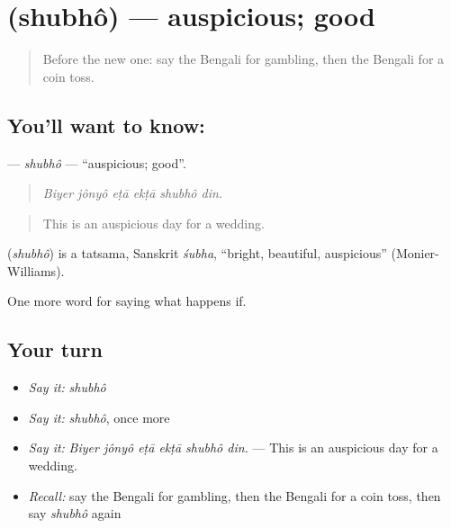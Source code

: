\section[\texorpdfstring{\bn{শুভ} (shubhô)}{শুভ (shubhô)}]{ (shubhô) — auspicious; good}

\label{lesson:BN-C534-shubho}



\begin{quote}
Before the new one: say the Bengali for gambling, then the Bengali for a coin toss.
\end{quote}

\subsection*{You'll want to know: }
\textbf{} — \emph{shubhô} — \textquotedblleft{}auspicious; good\textquotedblright{}.

\begin{quote}
     
\end{quote}

\begin{quote}
\emph{Biyer jônyô eṭā ekṭā shubhô din.}
\end{quote}

\begin{quote}
This is an auspicious day for a wedding.
\end{quote}

\begin{cousinweb}
\textbf{} (\emph{shubhô}) is a tatsama, Sanskrit \emph{śubha}, \textquotedblleft{}bright, beautiful, auspicious\textquotedblright{} (Monier-Williams).
\end{cousinweb}

\begin{grammarlens}[title={What you've built}]
One more word for saying what happens if.
\end{grammarlens}

\subsection*{Your turn}
\begin{itemize}
\raggedright
  \item \emph{Say it:} \emph{shubhô}
  \item \emph{Say it:} \emph{shubhô}, once more
  \item \emph{Say it:} \emph{Biyer jônyô eṭā ekṭā shubhô din.} — This is an auspicious day for a wedding.
  \item \emph{Recall:} say the Bengali for gambling, then the Bengali for a coin toss, then say \emph{shubhô} again
\end{itemize}

